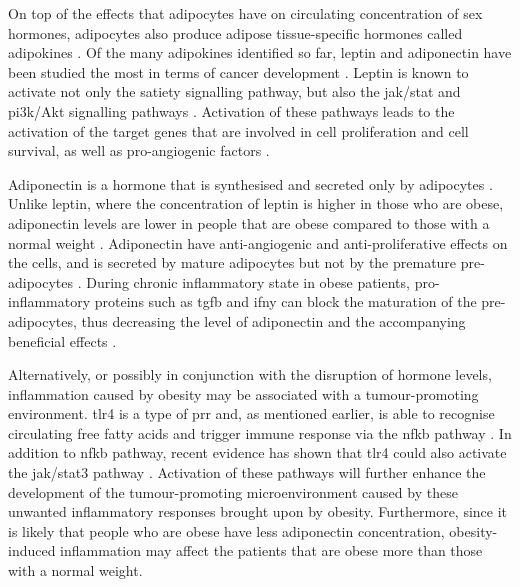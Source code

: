 On top of the effects that \glspl{adipocyte} have on circulating concentration of sex hormones, \glspl{adipocyte} also produce adipose tissue-specific hormones called adipokines \citep{Roberts2010}.
Of the many adipokines identified so far, leptin and adipo\-nectin have been studied the most in terms of cancer development \citep{Renehan2006,Roberts2010}.
Leptin is known to activate not only the satiety signalling pathway, but also the \gls{jak}/\gls{stat} and \gls{pi3k}/Akt signalling pathways \citep{Garofalo2006,Renehan2006}.
Activation of these pathways leads to the activation of the target genes that are involved in cell proliferation and cell survival, as well as pro-angiogenic factors \citep{Garofalo2006}.

Adiponectin is a hormone that is synthesised and secreted only by \glspl{adipocyte} \citep{Kelesidis2006}.
Unlike leptin, where the concentration of leptin is higher in those who are obese, adiponectin levels are lower in people that are obese compared to those with a normal weight \citep{Kelesidis2006,Renehan2006}.
Adiponectin have anti-angiogenic and anti-proliferative effects on the cells, and is secreted by mature \glspl{adipocyte} but not by the premature pre-adipocytes \citep{Gilbert2013}.
During chronic inflammatory state in obese patients, pro-inflammatory proteins such as \gls{tgfb} and \gls{ifny} can block the maturation of the pre-adipocytes, thus decreasing the level of adiponectin and the accompanying beneficial effects \citep{Gilbert2013}.

Alternatively, or possibly in conjunction with the disruption of hormone levels, inflammation caused by obesity may be associated with a tumour-promoting environment.
\Gls{tlr}4 is a type of \gls{prr} and, as mentioned earlier, is able to recognise circulating free fatty acids and trigger immune response via the \gls{nfkb} pathway \citep{Lumeng2011}.
In addition to \gls{nfkb} pathway, recent evidence has shown that \gls{tlr}4 could also activate the \gls{jak}/\gls{stat3} pathway \citep{Yu2014}.
Activation of these pathways will further enhance the development of the tumour-promoting microenvironment caused by these unwanted inflammatory responses brought upon by obesity.
Furthermore, since it is likely that people who are obese have less adiponectin concentration, obesity-induced inflammation may affect the patients that are obese more than those with a normal weight.

